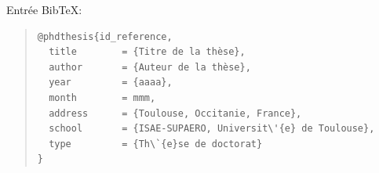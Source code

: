     \vspace{0.4cm}

    Entrée Bib\TeX{}:
    \begin{quote}
        \begin{verbatim}
@phdthesis{id_reference,
  title        = {Titre de la thèse},
  author       = {Auteur de la thèse},
  year         = {aaaa},
  month        = mmm,
  address      = {Toulouse, Occitanie, France},
  school       = {ISAE-SUPAERO, Universit\'{e} de Toulouse},
  type         = {Th\`{e}se de doctorat}
}
        \end{verbatim}
    \end{quote}


\cleardoublepage%

\null%


\null%

\restoregeometry%
\pagestyle{fancy}
